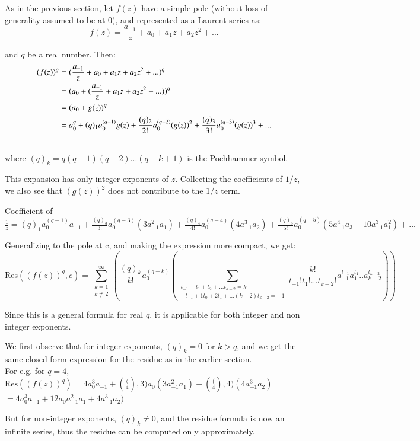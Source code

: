 \documentclass[a4paper,11pt,twoside]{amsart}
\newcommand\Res{\mathrm{Res}}
\begin{document}
As in the previous section, let $f(z)$ have a simple pole (without loss of generality assumed to be at 0), and represented as a Laurent series as:
$$f(z) = \frac{a_{-1}}{z} + a_0 + a_1 z + a_2 z^2 + ...$$

and $q$ be a real number. Then:
\begin{align}
(f(z))^q &= (\frac{a_{-1}}{z} + a_0 + a_1 z + a_2 z^2 + ...)^q \notag\\
&= (a_0 + (\frac{a_{-1}}{z} + a_1 z + a_2 z^2 + ...))^q\notag\\
&= (a_0 + g(z))^q\notag\\
&= a_{0}^q + (q)_{1} a_{0}^{(q-1)} g(z) + \frac{(q)_{2}}{2!} a_{0}^{(q-2)} (g(z))^2 + \frac{(q)_{3}}{3!} a_{0}^{(q-3)} (g(z))^3 + ...\notag\\
\notag
\end{align}
where $(q)_k = q(q-1)(q-2)...(q-k+1)$ is the Pochhammer symbol.

This expansion has only integer exponents of $z$. Collecting the coefficients of $1/z$, we also see that $(g(z))^2$ does not contribute to the $1/z$ term.

Coefficient of $\frac{1}{z} = (q)_{1} a_{0}^{(q-1)} a_{-1} + \frac{(q)_{3}}{3!} a_{0}^{(q-3)} (3 a_{-1}^2 a_1) + \frac{(q)_{4}}{4!} a_{0}^{(q-4)} (4 a_{-1}^3 a_2) + \frac{(q)_{5}}{5!} a_{0}^{(q-5)} (5 a_{-1}^4 a_3 + 10 a_{-1}^3 a_{1}^2) + ...$

Generalizing to the pole at c, and making the expression more compact, we get: 
$$\Res\left((f(z))^q,c\right) = \sum\limits_{\substack{k=1 \\ k \ne 2}}^{\infty} \left(\frac{(q)_{k}}{k!} a_{0}^{(q-k)} \left(\sum\limits_{\substack{t_{-1} + t_1 + t_2 + ... t_{k-2} = k \\ -t_{-1} + 1t_0 + 2t_1 + ... (k-2)t_{k-2} = -1}} \frac{k!}{t_{-1}!t_{1}!...t_{k-2}!} a_{-1}^{t_{-1}} a_{1}^{t_1}..a_{k-2}^{t_{k-2}}\right)\right)$$

Since this is a general formula for real $q$, it is applicable for both integer and non integer exponents.

We first observe that for integer exponents, $(q)_k = 0$ for $k>q$, and we get the same closed form expression for the residue as in the earlier section.\\
For e.g. for $q=4$, $\Res\left((f(z))^q\right) = 4 a_{0}^3 a_{-1} + \binom(4,3) a_0 (3 a_{-1}^2 a_1) + \binom(4,4) (4 a_{-1}^3 a_2)$
$=4 a_{0}^3 a_{-1} + 12 a_0 a_{-1}^2 a_1 + 4 a_{-1}^3 a_2)$

But for non-integer exponents, $(q)_k \ne 0$, and the residue formula is now an infinite series, thus the residue can be computed only approximately.
\end{document}
